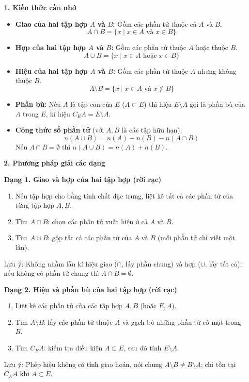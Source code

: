 \textbf{1. Kiến thức cần nhớ}
\begin{itemize}
\item \textbf{Giao của hai tập hợp $A$ và $B$:} Gồm các phần tử thuộc cả $A$ và $B$.
\[ \boxed{A \cap B = \{x \mid x \in A \text{ và } x \in B\}} \]
\item \textbf{Hợp của hai tập hợp $A$ và $B$:} Gồm các phần tử thuộc $A$ hoặc thuộc $B$.
\[ \boxed{A \cup B = \{x \mid x \in A \text{ hoặc } x \in B\}} \]
\item \textbf{Hiệu của hai tập hợp $A$ và $B$:} Gồm các phần tử thuộc $A$ nhưng không thuộc $B$.
\[ \boxed{A \setminus B = \{x \mid x \in A \text{ và } x \notin B\}} \]
\item \textbf{Phần bù:} Nếu $A$ là tập con của $E$ ($A \subset E$) thì hiệu $E \setminus A$ gọi là phần bù của $A$ trong $E$, kí hiệu $\boxed{C_E A = E \setminus A}$.
\item \textbf{Công thức số phần tử} (với $A, B$ là các tập hữu hạn):
\[ \boxed{n(A \cup B) = n(A) + n(B) - n(A \cap B)} \]
Nếu $A \cap B = \emptyset$ thì $n(A \cup B) = n(A) + n(B)$.
\end{itemize}

\textbf{2. Phương pháp giải các dạng}

\textbf{Dạng 1. Giao và hợp của hai tập hợp (rời rạc)}
\begin{enumerate}
\item Nếu tập hợp cho bằng tính chất đặc trưng, liệt kê tất cả các phần tử của từng tập hợp $A, B$.
\item Tìm $A \cap B$: chọn các phần tử xuất hiện ở cả $A$ và $B$.
\item Tìm $A \cup B$: gộp tất cả các phần tử của $A$ và $B$ (mỗi phần tử chỉ viết một lần).
\end{enumerate}
Lưu ý: Không nhầm lẫn kí hiệu giao ($\cap$, lấy phần chung) và hợp ($\cup$, lấy tất cả); nếu không có phần tử chung thì $A \cap B = \emptyset$.

\textbf{Dạng 2. Hiệu và phần bù của hai tập hợp (rời rạc)}
\begin{enumerate}
\item Liệt kê các phần tử của các tập hợp $A, B$ (hoặc $E, A$).
\item Tìm $A \setminus B$: lấy các phần tử thuộc $A$ và gạch bỏ những phần tử có mặt trong $B$.
\item Tìm $C_E A$: kiểm tra điều kiện $A \subset E$, sau đó tính $E \setminus A$.
\end{enumerate}
Lưu ý: Phép hiệu không có tính giao hoán, nói chung $A \setminus B \neq B \setminus A$; chỉ tồn tại $C_E A$ khi $A \subset E$.

